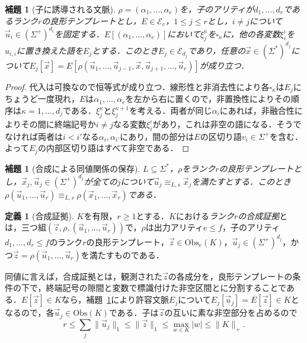 \documentclass[11pt,a4paper]{ltjsarticle}
\numberwithin{equation}{section}
\theoremstyle{plain}
\newtheorem{lemma}[theorem]{補題}
\theoremstyle{definition}
\newtheorem{definition}[theorem]{定義}
\theoremstyle{remark}
\newcommand{\tuple}[1]{\vec{#1}}
\newcommand{\blank}{\square}
\begin{document}
\begin{lemma}[子に誘導される文脈]
\label{lem:filling-identity}
$\rho=(\alpha_1,\ldots,\alpha_e)$を，子のアリティが$d_1,\ldots,d_r$であるランク$r$の良形テンプレートとし，$E\in\mathcal E_e$，$1\le j\le r$とし，$i\ne j$について$\tuple u_i\in(\Sigma^+)^{d_i}$を固定する．$E[(\alpha_1,\ldots,\alpha_e)]$において$\xi_j^\kappa$を$\blank_\kappa$に，他の各変数$\xi_i^\iota$を$u_{i,\iota}$に置き換えた語を$E_j$とする．このとき$E_j\in\mathcal E_{d_j}$であり，任意の$\tuple x\in(\Sigma^*)^{d_j}$について$E_j[\tuple x]=E[\rho(\tuple u_1,\ldots,\tuple u_{j-1},\tuple x,\tuple u_{j+1},\ldots,\tuple u_r)]$が成り立つ．
\end{lemma}

\begin{proof}
代入は可換なので恒等式が成り立つ．線形性と非消去性により各$\blank_\kappa$は$E_j$にちょうど一度現れ，$E$は$\alpha_1,\ldots,\alpha_e$を左から右に置くので，非置換性によりその順序は$\kappa=1,\ldots,d_j$である．$\xi_j^\kappa$と$\xi_j^{\kappa+1}$を考える．両者が同じ$\alpha_i$にあれば，非融合性によりその間に終端記号か$i\ne j$なる変数$\xi_i^\iota$があり，これは非空の語になる．そうでなければ両者は$i<i'$なる$\alpha_i,\alpha_{i'}$にあり，間の部分は$E$の区切り語$v_i\in\Sigma^+$を含む．よって$E_j$の内部区切り語はすべて非空である．
\end{proof}

\begin{lemma}[合成による同値関係の保存]
\label{lem:witnessed-composition}
$L\subseteq\Sigma^*$，$\rho$をランク$r$の良形テンプレートとし，$\tuple x_j,\tuple u_j\in(\Sigma^+)^{d_j}$が全ての$j$について$\tuple u_j\equiv_{L,s}\tuple x_j$を満たすとする．このとき$\rho(\tuple u_1,\ldots,\tuple u_r)\equiv_{L,s}\rho(\tuple x_1,\ldots,\tuple x_r)$である．
\end{lemma}

\begin{definition}[合成証拠]
\label{def:composition-witness}
$K$を有限，$r\ge1$とする．$K$における\emph{ランク$r$の合成証拠}とは，三つ組$(\tuple z,\rho,(\tuple u_1,\ldots,\tuple u_r))$で，$\rho$は出力アリティ$e\le f$，子のアリティ$d_1,\ldots,d_r\le f$のランク$r$の良形テンプレート，$\tuple z\in\mathrm{Obs}_e(K)$，$\tuple u_j\in(\Sigma^+)^{d_j}$，かつ$\tuple z=\rho(\tuple u_1,\ldots,\tuple u_r)$を満たすものである．
\end{definition}

同値に言えば，合成証拠とは，観測された$\tuple z$の各成分を，良形テンプレートの条件の下で，終端記号の隙間と変数で標識付けた非空区間とに分割することである．$E[\tuple z]\in K$なら，補題~\ref{lem:filling-identity}により許容文脈$E_j$について$E_j[\tuple u_j]=E[\tuple z]\in K$となるので，各$\tuple u_j\in\mathrm{Obs}(K)$である．子は$\tuple z$の互いに素な非空部分を占めるので
\begin{equation}
\label{eq:sample-rank}
 r\le\textstyle\sum_j\|\tuple u_j\|_1\le\|\tuple z\|_1\le\max_{w\in K}|w|
 \le\|K\|_+ .
\end{equation}
\end{document}
